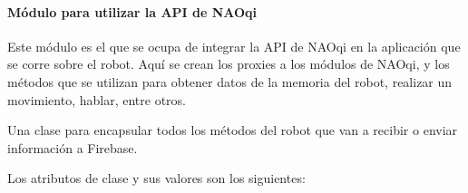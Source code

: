 \paragraph{Módulo para utilizar la API de NAOqi}
\label{\detokenize{nao_firebase:modulo-para-utiizar-modulos-de-naoqi}}
Este módulo es el que se ocupa de integrar la API de NAOqi en la aplicación
que se corre sobre el robot. Aquí se crean los proxies a los módulos de NAOqi,
y los métodos que se utilizan para obtener datos de la memoria del robot,
realizar un movimiento, hablar, entre otros.

\label{\detokenize{nao_firebase:module-nao_robot}}

\begin{fulllineitems}
\label{\detokenize{nao_firebase:nao_robot.Robot}}
Una clase para encapsular todos los métodos del robot
que van a recibir o enviar información a Firebase.

Los atributos de clase y sus valores son los siguientes:

%
\begin{sphinxVerbatim}[commandchars=\\\{\}]
  
  
  
  
  
  
  \PYG{p}{[}
    \PYG{p}{[} \PYG{p}{]}
    \PYG{p}{[} \PYG{p}{]}
    \PYG{p}{[} \PYG{p}{]}
    \PYG{p}{[} \PYG{p}{]}
    \PYG{p}{[} \PYG{p}{]}
\PYG{p}{]}
\end{sphinxVerbatim}


\end{fulllineitems}
